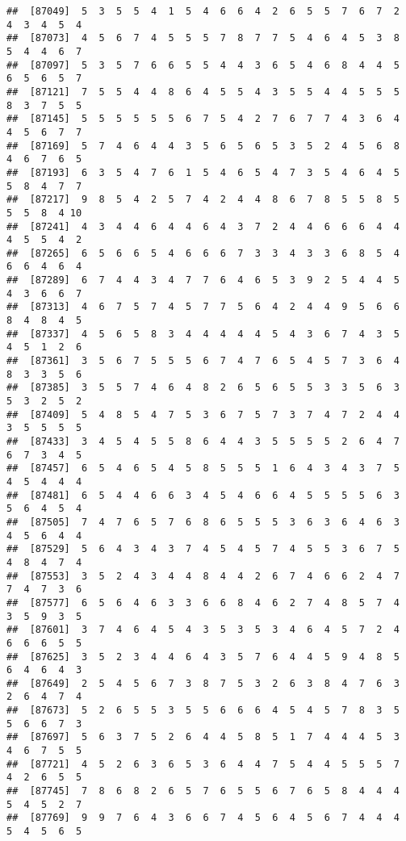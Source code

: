 \documentclass[
]{book}
\begin{document}
\begin{verbatim}
##  [87049]  5  3  5  5  4  1  5  4  6  6  4  2  6  5  5  7  6  7  2  4  3  4  5  4
##  [87073]  4  5  6  7  4  5  5  5  7  8  7  7  5  4  6  4  5  3  8  5  4  4  6  7
##  [87097]  5  3  5  7  6  6  5  5  4  4  3  6  5  4  6  8  4  4  5  6  5  6  5  7
##  [87121]  7  5  5  4  4  8  6  4  5  5  4  3  5  5  4  4  5  5  5  8  3  7  5  5
##  [87145]  5  5  5  5  5  5  6  7  5  4  2  7  6  7  7  4  3  6  4  4  5  6  7  7
##  [87169]  5  7  4  6  4  4  3  5  6  5  6  5  3  5  2  4  5  6  8  4  6  7  6  5
##  [87193]  6  3  5  4  7  6  1  5  4  6  5  4  7  3  5  4  6  4  5  5  8  4  7  7
##  [87217]  9  8  5  4  2  5  7  4  2  4  4  8  6  7  8  5  5  8  5  5  5  8  4 10
##  [87241]  4  3  4  4  6  4  4  6  4  3  7  2  4  4  6  6  6  4  4  4  5  5  4  2
##  [87265]  6  5  6  6  5  4  6  6  6  7  3  3  4  3  3  6  8  5  4  6  6  4  6  4
##  [87289]  6  7  4  4  3  4  7  7  6  4  6  5  3  9  2  5  4  4  5  4  3  6  6  7
##  [87313]  4  6  7  5  7  4  5  7  7  5  6  4  2  4  4  9  5  6  6  8  4  8  4  5
##  [87337]  4  5  6  5  8  3  4  4  4  4  4  5  4  3  6  7  4  3  5  4  5  1  2  6
##  [87361]  3  5  6  7  5  5  5  6  7  4  7  6  5  4  5  7  3  6  4  8  3  3  5  6
##  [87385]  3  5  5  7  4  6  4  8  2  6  5  6  5  5  3  3  5  6  3  5  3  2  5  2
##  [87409]  5  4  8  5  4  7  5  3  6  7  5  7  3  7  4  7  2  4  4  3  5  5  5  5
##  [87433]  3  4  5  4  5  5  8  6  4  4  3  5  5  5  5  2  6  4  7  6  7  3  4  5
##  [87457]  6  5  4  6  5  4  5  8  5  5  5  1  6  4  3  4  3  7  5  4  5  4  4  4
##  [87481]  6  5  4  4  6  6  3  4  5  4  6  6  4  5  5  5  5  6  3  5  6  4  5  4
##  [87505]  7  4  7  6  5  7  6  8  6  5  5  5  3  6  3  6  4  6  3  4  5  6  4  4
##  [87529]  5  6  4  3  4  3  7  4  5  4  5  7  4  5  5  3  6  7  5  4  8  4  7  4
##  [87553]  3  5  2  4  3  4  4  8  4  4  2  6  7  4  6  6  2  4  7  7  4  7  3  6
##  [87577]  6  5  6  4  6  3  3  6  6  8  4  6  2  7  4  8  5  7  4  3  5  9  3  5
##  [87601]  3  7  4  6  4  5  4  3  5  3  5  3  4  6  4  5  7  2  4  6  6  6  5  5
##  [87625]  3  5  2  3  4  4  6  4  3  5  7  6  4  4  5  9  4  8  5  6  4  6  4  3
##  [87649]  2  5  4  5  6  7  3  8  7  5  3  2  6  3  8  4  7  6  3  2  6  4  7  4
##  [87673]  5  2  6  5  5  3  5  5  6  6  6  4  5  4  5  7  8  3  5  5  6  6  7  3
##  [87697]  5  6  3  7  5  2  6  4  4  5  8  5  1  7  4  4  4  5  3  4  6  7  5  5
##  [87721]  4  5  2  6  3  6  5  3  6  4  4  7  5  4  4  5  5  5  7  4  2  6  5  5
##  [87745]  7  8  6  8  2  6  5  7  6  5  5  6  7  6  5  8  4  4  4  5  4  5  2  7
##  [87769]  9  9  7  6  4  3  6  6  7  4  5  6  4  5  6  7  4  4  4  5  4  5  6  5

\end{verbatim}
\end{document}

